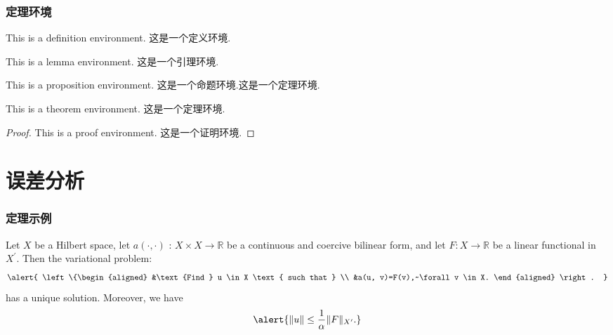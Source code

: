 \documentclass[noamsthm,notheorems,11pt,compress]{beamer}
\begin{document}
\begin{frame}
\frametitle{定理环境}
\begin{definition}
This is a definition environment. 这是一个定义环境.
\end{definition}

\begin{lemma}
This is a lemma environment. 这是一个引理环境.
\end{lemma}

\begin{proposition}
This is a proposition environment. 这是一个命题环境.这是一个定理环境.
\end{proposition}

\begin{theorem}
This is a theorem environment. 这是一个定理环境.
\end{theorem}

\begin{proof}
  This is a proof environment. 这是一个证明环境.
\end{proof}

\end{frame}

\section{误差分析}

\begin{frame}
\frametitle{定理示例}

\begin{theorem} \upshape
Let $X$ be a Hilbert space, let $a(\cdot, \cdot)$ : $X \times X \rightarrow \mathbb{R}$ be a continuous and coercive bilinear form, and let $F : X \rightarrow \mathbb{R}$ be a linear functional in $X^{\prime}$. Then the variational problem:
\begin{equation}
  \alert{
  \left\{\begin{aligned}
  &\text {Find } u \in X \text { such that } \\
  &a(u, v)=F(v),~\forall v \in X.
  \end{aligned} \right. }
\end{equation}
has a unique solution. Moreover, we have
\begin{equation}
  \alert{ \|u\| \leq \frac{1}{\alpha}\|F\|_{X^{\prime}}.  }
\end{equation}
\end{theorem}

\end{frame}
\end{document}
